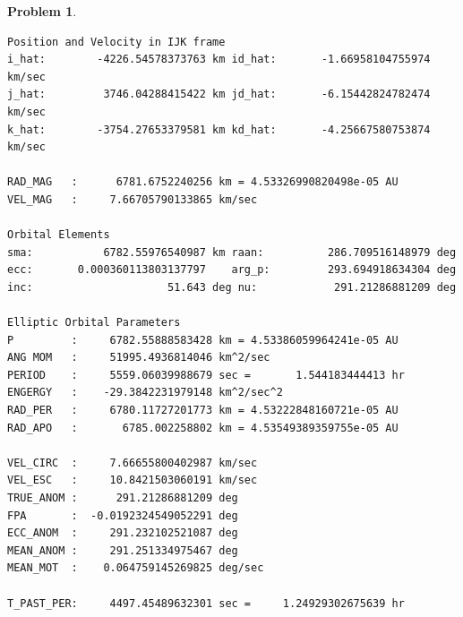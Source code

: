 \documentclass[10pt]{article}
\theoremstyle{definition}
\newtheorem{prob}{Problem}[section]
\begin{document}
\begin{prob}
\begin{verbatim}
Position and Velocity in IJK frame                                             
i_hat:        -4226.54578373763 km id_hat:       -1.66958104755974 km/sec      
j_hat:         3746.04288415422 km jd_hat:       -6.15442824782474 km/sec      
k_hat:        -3754.27653379581 km kd_hat:       -4.25667580753874 km/sec      
                                                                               
RAD_MAG   :      6781.6752240256 km = 4.53326990820498e-05 AU                  
VEL_MAG   :     7.66705790133865 km/sec                                        
                                                                               
Orbital Elements                                                               
sma:           6782.55976540987 km raan:          286.709516148979 deg         
ecc:       0.000360113803137797    arg_p:         293.694918634304 deg         
inc:                     51.643 deg nu:            291.21286881209 deg         
                                                                               
Elliptic Orbital Parameters                                                    
P         :     6782.55888583428 km = 4.53386059964241e-05 AU                  
ANG MOM   :     51995.4936814046 km^2/sec                                      
PERIOD    :     5559.06039988679 sec =       1.544183444413 hr                 
ENGERGY   :    -29.3842231979148 km^2/sec^2
RAD_PER   :     6780.11727201773 km = 4.53222848160721e-05 AU
RAD_APO   :       6785.002258802 km = 4.53549389359755e-05 AU

VEL_CIRC  :     7.66655800402987 km/sec
VEL_ESC   :     10.8421503060191 km/sec
TRUE_ANOM :      291.21286881209 deg
FPA       :  -0.0192324549052291 deg
ECC_ANOM  :     291.232102521087 deg
MEAN_ANOM :     291.251334975467 deg
MEAN_MOT  :    0.064759145269825 deg/sec

T_PAST_PER:     4497.45489632301 sec =     1.24929302675639 hr
    \end{verbatim}
\end{prob}
\end{document}
